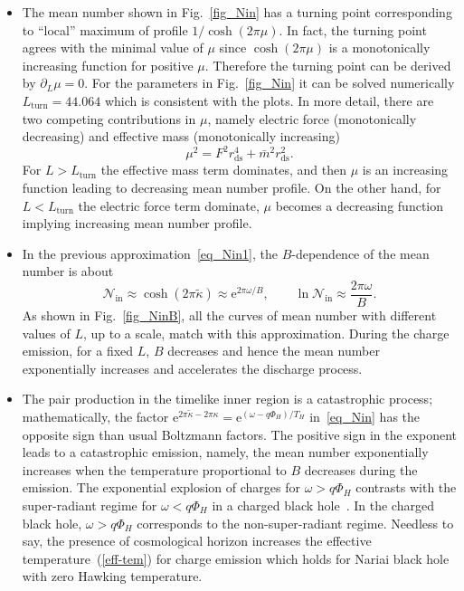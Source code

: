 \documentclass[aps,nofootinbib,superscriptaddress
]{revtex4}
\begin{document}
\begin{itemize}
\item The mean number shown in Fig.~\ref{fig_Nin} has a turning point corresponding to ``local'' maximum of profile $1/\cosh(2 \pi \mu)$. In fact, the turning point agrees with the minimal value of $\mu$ since $\cosh(2 \pi \mu)$ is a monotonically increasing function for positive $\mu$. Therefore the turning point can be derived by $\partial_L \mu = 0$. For the parameters in Fig.~\ref{fig_Nin} it can be solved numerically $L_\mathrm{turn} = 44.064$ which is consistent with the plots. In more detail, there are two competing contributions in $\mu$, namely electric force (monotonically decreasing) and effective mass (monotonically increasing)
    $$ \mu^2 = F^2 r_\mathrm{ds}^4 + \bar{m}^2 r_\mathrm{ds}^2. $$
    For $L > L_\mathrm{turn}$ the effective mass term dominates, and then $\mu$ is an increasing function leading to decreasing mean number profile. On the other hand, for $L < L_\mathrm{turn}$ the electric force term dominate, $\mu$ becomes a decreasing function implying increasing mean number profile.

\item In the previous approximation~\eqref{eq_Nin1}, the $B$-dependence of the mean number is about
    \begin{equation}
     \mathcal{N}_\mathrm{in} \approx \cosh(2 \pi \tilde{\kappa}) \approx \mathrm{e}^{2 \pi \omega/B}, \qquad \ln\mathcal{N}_\mathrm{in} \approx \frac{2 \pi \omega}{B}.
    \end{equation}
    As shown in Fig.~\ref{fig_NinB}, all the curves of mean number with different values of $L$, up to a scale, match with this approximation. During the charge emission, for a fixed $L$, $B$ decreases and hence the mean number  exponentially increases and accelerates the discharge process.

\item The pair production in the timelike inner region is a catastrophic process; mathematically, the factor $\mathrm{e}^{2 \pi \tilde\kappa - 2 \pi \kappa} = \mathrm{e}^{(\omega - q \Phi_H)/T_H}$ in~\eqref{eq_Nin} has the opposite sign than usual Boltzmann factors. The positive sign in the exponent leads to a catastrophic emission, namely, the mean number exponentially increases when the temperature proportional to $B$ decreases during the emission. The exponential explosion of charges for $\omega > q \Phi_H$ contrasts with the super-radiant regime for $\omega < q \Phi_H$ in a charged black hole~\cite{Moss:2023kah}. In the charged black hole, $\omega > q \Phi_H$ corresponds to the non-super-radiant regime. Needless to say, the presence of cosmological horizon increases the effective temperature~(\ref{eff-tem}) for charge emission which holds for Nariai black hole with zero Hawking temperature.

\end{itemize}
\end{document}
